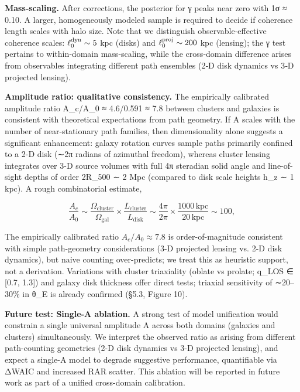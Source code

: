 \documentclass[11pt,a4paper]{article}
\begin{document}
\textbf{Mass‑scaling.} After corrections, the posterior for γ peaks near zero with 1σ ≈ 0.10. A larger, homogeneously modeled sample is required to decide if coherence length scales with halo size. Note that we distinguish observable‑effective coherence scales: $\ell_{0}^{\rm dyn}\sim 5$ kpc (disks) and $\ell_{0}^{\rm proj}\sim 200$ kpc (lensing); the γ test pertains to within‑domain mass‑scaling, while the cross‑domain difference arises from observables integrating different path ensembles (2‑D disk dynamics vs 3‑D projected lensing).


\textbf{Amplitude ratio: qualitative consistency.} The empirically calibrated amplitude ratio A\_c/A\_0 ≈ 4.6/0.591 ≈ 7.8 between clusters and galaxies is consistent with theoretical expectations from path geometry. If A scales with the number of near-stationary path families, then dimensionality alone suggests a significant enhancement: galaxy rotation curves sample paths primarily confined to a 2-D disk (∼2π radians of azimuthal freedom), whereas cluster lensing integrates over 3-D source volumes with full 4π steradian solid angle and line-of-sight depths of order 2R\_500 ∼ 2 Mpc (compared to disk scale heights h\_z ∼ 1 kpc). A rough combinatorial estimate,


\begin{equation}
\frac{A_c}{A_0} \sim \frac{\Omega_{\mathrm{cluster}}}{\Omega_{\mathrm{gal}}} \times \frac{L_{\mathrm{cluster}}}{L_{\mathrm{disk}}} \sim \frac{4\pi}{2\pi} \times \frac{1000\,\mathrm{kpc}}{20\,\mathrm{kpc}} \sim 100,
\end{equation}


The empirically calibrated ratio $A_c/A_0 \approx 7.8$ is order-of-magnitude consistent with simple path-geometry considerations (3-D projected lensing vs. 2-D disk dynamics), but naive counting over-predicts; we treat this as heuristic support, not a derivation. Variations with cluster triaxiality (oblate vs prolate; q\_LOS ∈ [0.7, 1.3]) and galaxy disk thickness offer direct tests; triaxial sensitivity of ∼20–30\% in θ\_E is already confirmed (§5.3, Figure 10).


\textbf{Future test: Single-A ablation.} A strong test of model unification would constrain a single universal amplitude A across both domains (galaxies and clusters) simultaneously. We interpret the observed ratio as arising from different path-counting geometries (2-D disk dynamics vs 3-D projected lensing), and expect a single-A model to degrade suggestive performance, quantifiable via ΔWAIC and increased RAR scatter. This ablation will be reported in future work as part of a unified cross-domain calibration.
\end{document}
